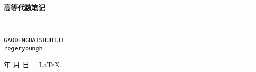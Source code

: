 \documentclass[cn,11pt,blue,pad,cn,founder]{elegantbook}
\begin{document}
\newcommand\mfrac[2]{\dfrac{#1\smash[b]{\strut}}{#2\smash[t]{\strut}}}
\newcommand\RR{\mathbb{R}}
\newcommand\NN{\mathbb{N}}
\newcommand\QQ{\mathbb{Q}}
\newcommand\CC{\mathbb{C}}
\newcommand\ee{\mathrm{e}}
\newcommand\dd{\mathrm{d}}
\newcommand\uppi{\mathrm{\pi}}

\newcommand\rank{\operatorname{rank}}
\newcommand\diag{\operatorname{diag}}
\renewcommand\Im{\operatorname{Im}}
\newcommand\tr{\operatorname{tr}}

\newcommand\aaa{\boldsymbol{\alpha}}
\newcommand\AAA{\boldsymbol{A}}
\newcommand\bbb{\boldsymbol{\beta}}
\newcommand\eee{\boldsymbol{\eta}}
\renewcommand\ggg{\boldsymbol{\gamma}}
\newcommand\XXX{\boldsymbol{X}}
\newcommand\YYY{\boldsymbol{Y}}
\newcommand\ling{\boldsymbol{0}}

\begin{titlepage}
	\vspace*{25ex}%
	\begin{minipage}{.9\textwidth}
	\flushright
		{\textbf{高等代数笔记}}\\%
		\rule{\linewidth}{1pt}\\ \vspace{2ex}
		{\texttt{GAODENGDAISHUBIJI}} \\%
		\vspace{20ex}%
		{\texttt{rogeryoungh}}%
	\end{minipage}
	\vfill\centering
	{\number\year 年 \number\month 月 \number\day 日 · \LaTeX{}}
\end{titlepage}
\clearpage{\hypersetup{hidelinks}\tableofcontents}

\clearpage

\end{document}

